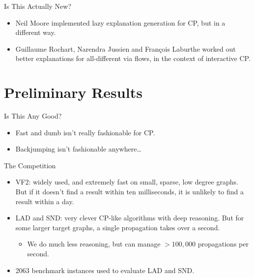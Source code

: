 \documentclass{beamer}
\begin{document}
\begin{frame}{Is This Actually New?}
    \begin{itemize}
        \item Neil Moore implemented lazy explanation generation for CP, but in a different way.

        \item Guillaume Rochart, Narendra Jussien and François Laburthe worked out better
            explanations for all-different via flows, in the context of interactive CP.
    \end{itemize}
\end{frame}

\section{Preliminary Results}

\frame{\sectionpage}

\begin{frame}{Is This Any Good?}
    \begin{itemize}
        \item Fast and dumb isn't really fashionable for CP.

        \item Backjumping isn't fashionable anywhere\ldots
    \end{itemize}
\end{frame}

\begin{frame}{The Competition}
    \begin{itemize}
        \item VF2: widely used, and extremely fast on small, sparse, low degree graphs. But if
            it doesn't find a result within ten milliseconds, it is unlikely to find a result
            within a day.

        \item LAD and SND: very clever CP-like algorithms with deep reasoning. But for some
            larger target graphs, a single propagation takes over a second.
            \begin{itemize}
                \item We do much less reasoning, but can manage $>100,000$ propagations per second.
            \end{itemize}

        \item 2063 benchmark instances used to evaluate LAD and SND.
    \end{itemize}
\end{frame}
\end{document}
